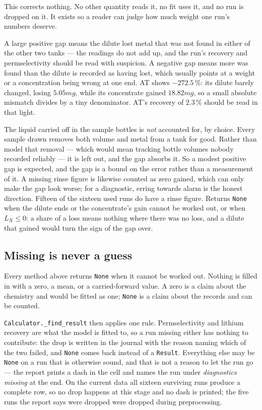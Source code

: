 This corrects nothing. No other quantity reads it, no fit uses it, and no run is dropped on it.
It exists so a reader can judge how much weight one run's numbers deserve.

A large positive gap means the dilute lost metal that was not found in either of the other two
tanks --- the readings do not add up, and the run's recovery and permselectivity should be read
with suspicion. A negative gap means more was found than the dilute is recorded as having lost,
which usually points at a weight or a concentration being wrong at one end. AT shows
$-272.5\,\%$: its dilute barely changed, losing $5.05\unit{mg}$, while its concentrate gained
$18.82\unit{mg}$, so a small absolute mismatch divides by a tiny denominator. AT's recovery of
$2.3\,\%$ should be read in that light.

The liquid carried off in the sample bottles is \emph{not} accounted for, by choice. Every sample
drawn removes both volume and metal from a tank for good. Rather than model that removal --- which
would mean tracking bottle volumes nobody recorded reliably --- it is left out, and the gap
absorbs it. So a modest positive gap is expected, and the gap is a bound on the error rather than
a measurement of it. A missing rinse figure is likewise counted as zero gained, which can only
make the gap look worse; for a diagnostic, erring towards alarm is the honest direction. Fifteen
of the sixteen used runs do have a rinse figure. Returns \texttt{None} when the dilute ends or
the concentrate's gain cannot be worked out, or when $L_X \le 0$: a share of a loss means nothing
where there was no loss, and a dilute that gained would turn the sign of the gap over.

\subsection{Missing is never a guess}

Every method above returns \texttt{None} when it cannot be worked out. Nothing is filled in with
a zero, a mean, or a carried-forward value. A zero is a claim about the chemistry and would be
fitted as one; \texttt{None} is a claim about the records and can be counted.

\texttt{Calculator.\_find\_result} then applies one rule. Permselectivity and lithium recovery
are what the model is fitted to, so a run missing either has nothing to contribute: the drop is
written in the journal with the reason naming which of the two failed, and \texttt{None} comes
back instead of a \texttt{Result}. Everything else may be \texttt{None} on a run that is
otherwise sound, and that is not a reason to let the run go --- the report prints a dash in the
cell and names the run under \emph{diagnostics missing} at the end. On the current data all
sixteen surviving runs produce a complete row, so no drop happens at this stage and no dash is
printed; the five runs the report says were dropped were dropped during preprocessing.

